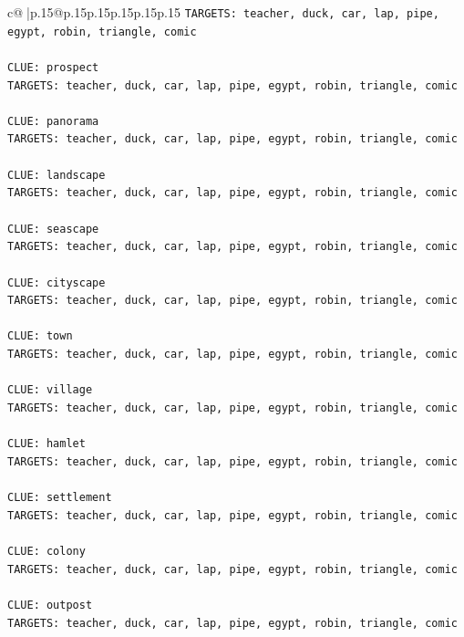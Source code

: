 \documentclass{article}
\begin{document}
{\begin{supertabular}{c@{$\;$}|p{.15\linewidth}@{}p{.15\linewidth}p{.15\linewidth}p{.15\linewidth}p{.15\linewidth}p{.15\linewidth}}
{{{\texttt{TARGETS: teacher, duck, car, lap, pipe, egypt, robin, triangle, comic} \\
\\ 
\texttt{CLUE: prospect} \\
\texttt{TARGETS: teacher, duck, car, lap, pipe, egypt, robin, triangle, comic} \\
\\ 
\texttt{CLUE: panorama} \\
\texttt{TARGETS: teacher, duck, car, lap, pipe, egypt, robin, triangle, comic} \\
\\ 
\texttt{CLUE: landscape} \\
\texttt{TARGETS: teacher, duck, car, lap, pipe, egypt, robin, triangle, comic} \\
\\ 
\texttt{CLUE: seascape} \\
\texttt{TARGETS: teacher, duck, car, lap, pipe, egypt, robin, triangle, comic} \\
\\ 
\texttt{CLUE: cityscape} \\
\texttt{TARGETS: teacher, duck, car, lap, pipe, egypt, robin, triangle, comic} \\
\\ 
\texttt{CLUE: town} \\
\texttt{TARGETS: teacher, duck, car, lap, pipe, egypt, robin, triangle, comic} \\
\\ 
\texttt{CLUE: village} \\
\texttt{TARGETS: teacher, duck, car, lap, pipe, egypt, robin, triangle, comic} \\
\\ 
\texttt{CLUE: hamlet} \\
\texttt{TARGETS: teacher, duck, car, lap, pipe, egypt, robin, triangle, comic} \\
\\ 
\texttt{CLUE: settlement} \\
\texttt{TARGETS: teacher, duck, car, lap, pipe, egypt, robin, triangle, comic} \\
\\ 
\texttt{CLUE: colony} \\
\texttt{TARGETS: teacher, duck, car, lap, pipe, egypt, robin, triangle, comic} \\
\\ 
\texttt{CLUE: outpost} \\
\texttt{TARGETS: teacher, duck, car, lap, pipe, egypt, robin, triangle, comic} \\
}}}
\end{supertabular}}
\end{document}
